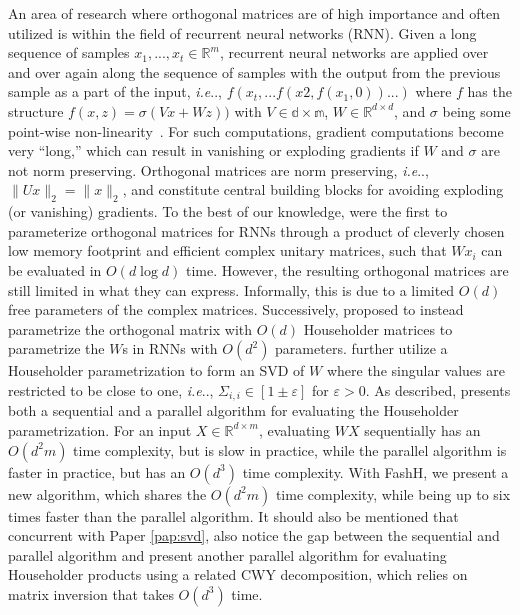 \documentclass[11pt,a4paper,twoside,openright,final]{memoir}
\makeatletter
\DeclareRobustCommand\onedot{\futurelet\@let@token\@onedot}
\def\@onedot{\ifx\@let@token.\else.\null\fi\xspace}
\def\ie{\emph{i.e}\onedot} \def\Ie{\emph{I.e}\onedot}
\newcommand*{\paperref}[1]{Paper \hyperref[#1]{\ref{#1}}}
\makeatother
\begin{document}
An area of research where orthogonal matrices are of high importance and often utilized is within the field of recurrent neural networks (RNN).
Given a long sequence of samples $x_1, ..., x_t\in\mathbb{R}^{m}$, recurrent neural networks are applied over and over again along the sequence of samples with the output from the previous sample as a part of the input, \ie, $f(x_t, ...f(x2, f(x_1, 0)) ... )$ where $f$ has the structure $f(x, z) = \sigma( Vx + Wz) )$ with $V\in \mathbb{d\times m}$, $W\in\mathbb{R}^{d\times d}$, and $\sigma$ being some point-wise non-linearity~\cite{urnn}.
For such computations, gradient computations become very ``long,'' which can result in vanishing or exploding gradients if $W$ and $\sigma$ are not norm preserving.
Orthogonal matrices are norm preserving, \ie, $\|Ux\|_2 = \|x\|_2$, and constitute central building blocks for avoiding exploding (or vanishing) gradients.
To the best of our knowledge, \citet{urnn} were the first to parameterize orthogonal matrices for RNNs through a product of cleverly chosen low memory footprint and efficient complex unitary matrices, such that $Wx_i$ can be evaluated in $O(d \log d)$ time.
However, the resulting orthogonal matrices are still limited in what they can express. 
Informally, this is due to a limited $O(d)$ free parameters of the complex matrices.
Successively, \citet{hh-rnn} proposed to instead parametrize the orthogonal matrix with $O(d)$ Householder matrices to parametrize the $W$s in RNNs with $O(d^2)$ parameters. 
\citet{sequential} further utilize a Householder parametrization to form an SVD of $W$ where the singular values are restricted to be close to one, \ie, $\Sigma_{i,i} \in [1\pm\varepsilon]$ for $\varepsilon > 0$. 
As described, \cite{sequential} presents both a sequential and a parallel algorithm for evaluating the Householder parametrization.
For an input $X\in\mathbb{R}^{d\times m}$, evaluating $WX$ sequentially has an $O(d^2m)$ time complexity, but is slow in practice, while the parallel algorithm is faster in practice, but has an $O(d^3)$ time complexity. 
With FashH, we present a new algorithm, which shares the $O(d^2m)$ time complexity, while being up to six times faster than the parallel algorithm.
It should also be mentioned that concurrent with \paperref{pap:svd}, \citet{cwy-dec} also notice the gap between the sequential and parallel algorithm and present another parallel algorithm for evaluating Householder products using a related CWY decomposition, which relies on matrix inversion that takes $O(d^3)$ time.
\end{document}
